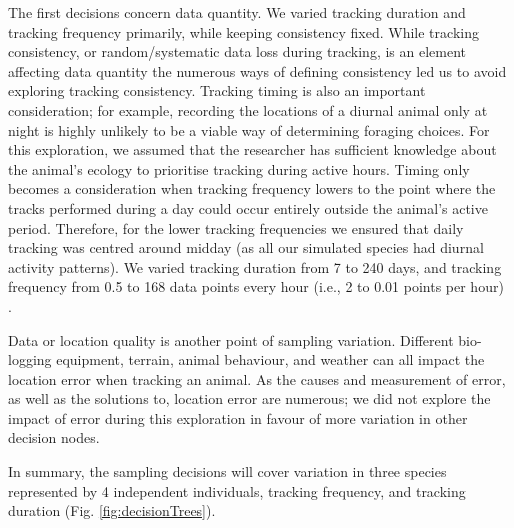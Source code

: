 \documentclass[10pt,a4paper]{article}
\begin{document}
The first decisions concern data quantity.
We varied tracking duration and tracking frequency primarily, while keeping consistency fixed.
While tracking consistency, or random/systematic data loss during tracking, is an element affecting data quantity the numerous ways of defining consistency led us to avoid exploring tracking consistency.
Tracking timing is also an important consideration; for example, recording the locations of a diurnal animal only at night is highly unlikely to be a viable way of determining foraging choices.
For this exploration, we assumed that the researcher has sufficient knowledge about the animal's ecology to prioritise tracking during active hours.
Timing only becomes a consideration when tracking frequency lowers to the point where the tracks performed during a day could occur entirely outside the animal's active period.
Therefore, for the lower tracking frequencies we ensured that daily tracking was centred around midday (as all our simulated species had diurnal activity patterns).
We varied tracking duration from 7 to 240 days, and tracking frequency from 0.5 to 168 data points every hour (i.e., 2 to 0.01 points per hour) .

Data or location quality is another point of sampling variation.
Different bio-logging equipment, terrain, animal behaviour, and weather can all impact the location error when tracking an animal.
As the causes and measurement of error, as well as the solutions to, location error are numerous; we did not explore the impact of error during this exploration in favour of more variation in other decision nodes.

In summary, the sampling decisions will cover variation in three species represented by 4 independent individuals, tracking frequency, and tracking duration (Fig. \ref{fig:decisionTrees}).
\end{document}
